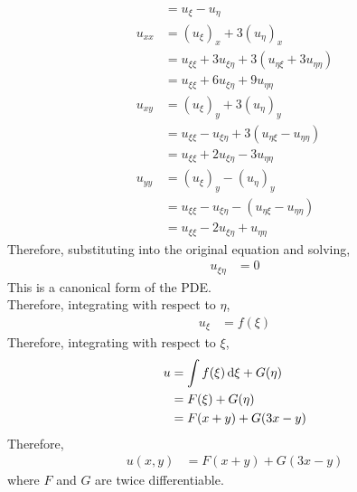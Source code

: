 \documentclass[titlepage, fleqn, a4paper, 12pt, twoside]{article}
\theoremstyle{definition}
\theoremstyle{theorem}
\begin{document}
\begin{solution}
\begin{align*}
                        & = u_{\xi} - u_{\eta}                                                \\
		u_{x x} & = (u_{\xi})_x + 3 (u_{\eta})_x                                      \\
                        & = u_{\xi \xi} + 3 u_{\xi \eta} + 3 (u_{\eta \xi} + 3 u_{\eta \eta}) \\
                        & = u_{\xi \xi} + 6 u_{\xi \eta} + 9 u_{\eta \eta}                    \\
		u_{x y} & = (u_{\xi})_y + 3 (u_{\eta})_y                                      \\
                        & = u_{\xi \xi} - u_{\xi \eta} + 3 (u_{\eta \xi} - u_{\eta \eta})     \\
                        & = u_{\xi \xi} + 2 u_{\xi \eta} - 3 u_{\eta \eta}                    \\
		u_{y y} & = (u_{\xi})_y - (u_{\eta})_y                                        \\
                        & = u_{\xi \xi} - u_{\xi \eta} - (u_{\eta \xi} - u_{\eta \eta})       \\
                        & = u_{\xi \xi} - 2 u_{\xi \eta} + u_{\eta \eta}
	\end{align*}
	Therefore, substituting into the original equation and solving,
	\begin{align*}
		u_{\xi \eta} & = 0
	\end{align*}
	This is a canonical form of the PDE.\\
	Therefore, integrating with respect to $\eta$,
	\begin{align*}
		u_{\xi} & = f(\xi)
	\end{align*}
	Therefore, integrating with respect to $\xi$,
	\begin{align*}
		u & = \int f(\xi) \dif \xi + G(\eta) \\
                  & = F(\xi) + G(\eta)               \\
                  & = F(x + y) + G(3 x - y)
	\end{align*}
	Therefore,
	\begin{align*}
		u(x,y) & = F(x + y) + G(3 x - y)
	\end{align*}
	where $F$ and $G$ are twice differentiable.
\end{solution}
\end{document}
